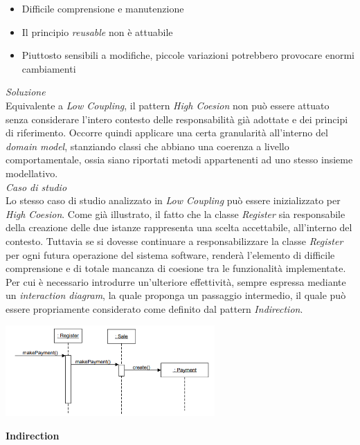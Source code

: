\documentclass{article}
\begin{document}
\begin{itemize}[label={-}]
    \itemsep0em
    \item Difficile comprensione e manutenzione
    \item Il principio \textit{reusable} non è attuabile
    \item Piuttosto sensibili a modifiche, piccole variazioni potrebbero provocare enormi cambiamenti
\end{itemize}\vspace*{7pt}
\textit{Soluzione}\\
Equivalente a \textit{Low Coupling}, il pattern \textit{High Coesion} non può essere attuato senza considerare l'intero contesto delle responsabilità già adottate e dei principi di riferimento. Occorre quindi applicare una certa granularità all'interno del \textit{domain model}, stanziando classi che abbiano una coerenza a livello comportamentale, ossia siano riportati metodi appartenenti ad uno stesso insieme modellativo.\vspace*{14pt}\\
\textit{Caso di studio}\\
Lo stesso caso di studio analizzato in \textit{Low Coupling} può essere inizializzato per \textit{High Coesion}. Come già illustrato, il fatto che la classe \textit{Register} sia responsabile della creazione delle due istanze rappresenta una scelta accettabile, all'interno del contesto. Tuttavia se si dovesse continuare a responsabilizzare la classe \textit{Register} per ogni futura operazione del sistema software, renderà l'elemento di difficile comprensione e di totale mancanza di coesione tra le funzionalità implementate. Per cui è necessario introdurre un'ulteriore effettività, sempre espressa mediante un \textit{interaction diagram}, la quale proponga un passaggio intermedio, il quale può essere propriamente considerato come definito dal pattern \textit{Indirection}.
\begin{center}
    \includegraphics[width=0.6\textwidth]{foto 4.png}\vspace{7pt}
\end{center}
\textbf{Indirection}\vspace*{7pt}\\
\end{document}
